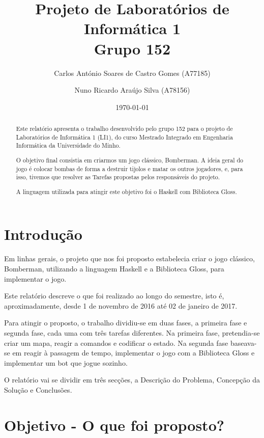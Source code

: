 \documentclass[a4paper]{article}
\title{Projeto de Laboratórios de Informática 1\\Grupo 152}
\author{Carlos António Soares de Castro Gomes (A77185) \and Nuno Ricardo Araújo Silva (A78156)}
\date{\today}
\begin{document}
\maketitle

\begin{abstract}
Este relatório apresenta o trabalho desenvolvido pelo grupo 152 para
o projeto de Laboratórios de Informática 1 (LI1), do curso Mestrado
Integrado em Engenharia Informática da Universidade do Minho.

O objetivo final consistia em criarmos um jogo clássico, Bomberman. A ideia
geral do jogo é colocar bombas de forma a destruir tijolos e matar os
outros jogadores, e, para isso, tivemos que resolver as Tarefas propostas
pelos responsáveis do projeto.

A linguagem utilizada para atingir este objetivo foi o Haskell com Biblioteca
Gloss.

\end{abstract}

\tableofcontents

\section{Introdução}
\label{sec:intro}


Em linhas gerais, o projeto que nos foi proposto estabelecia criar o jogo clássico, Bomberman, utilizando a
linguagem Haskell e a Biblioteca Gloss, para implementar o jogo.

Este relatório descreve o que foi realizado ao longo do semestre, isto é,
aproximadamente, desde 1 de novembro de 2016 até 02 de janeiro de 2017.

Para atingir o proposto, o trabalho dividiu-se em duas fases, a primeira fase
e segunda fase, cada uma com três tarefas diferentes. Na primeira fase, pretendia-se
criar um mapa, reagir a comandos e codificar o estado. Na segunda
fase baseava-se em reagir à passagem de tempo, implementar o jogo com a Biblioteca
Gloss e implementar um bot que jogue sozinho.

O relatório vai se dividir em três secções, a Descrição do Problema, Concepção da Solução
e Conclusões.

\section{Objetivo - O que foi proposto?}
\label{sec:problema}
\end{document}
